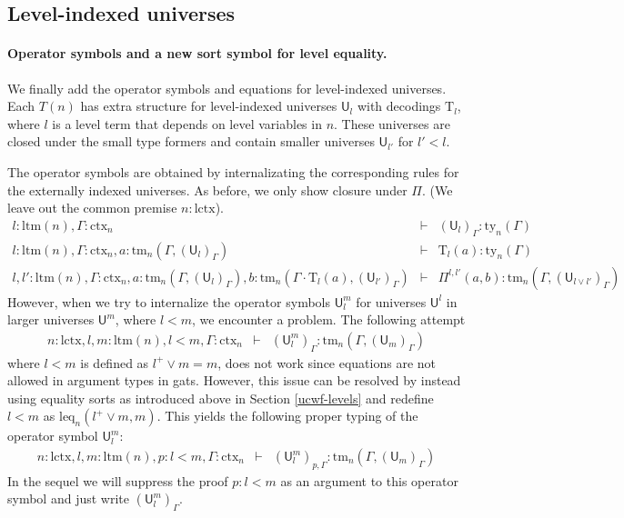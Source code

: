 \documentclass[11pt,a4paper]{article}
\theoremstyle{plain}
\theoremstyle{definition}
\newcommand{\UU}{\mathsf{U}}
\def\UU{\mathsf{U}}
\newcommand{\N}{\mathsf{N}}
\def\Pihat{\Pi}
\def\lctx{\mathrm{lctx}}
\def\ltm{\mathrm{ltm}}
\def\leq{\mathrm{leq}}
\newcommand{\ctx}{\mathrm{ctx}}
\newcommand{\ty}{\mathrm{ty}}
\newcommand{\tm}{\mathrm{tm}}
\def\U{\mathsf{U}}
\newcommand{\Ta}{\mathrm{T}}
\begin{document}
\subsection{Level-indexed universes}

\paragraph{Operator symbols and a new sort symbol for level equality.}
We finally add the operator symbols and equations for level-indexed universes.
Each $T(n)$ has extra structure for level-indexed universes $\UU_l$ with decodings $\Ta_l$, where $l$ is a level term that depends on level variables in $n$. These universes are closed under the small type formers and contain smaller universes $\UU_{l'}$ for $l' < l$.

The operator symbols are obtained by internalizating the corresponding rules for the externally indexed universes. As before, we only show closure under $\Pi$. (We leave out the common premise $n : \lctx$).
\begin{eqnarray*}
l : \ltm(n), \Gamma : \ctx_n &\vdash& (\U_{l})_\Gamma : \ty_n(\Gamma)\\
l : \ltm(n), \Gamma : \ctx_n, a : \tm_n(\Gamma,(\U_{l})_\Gamma) &\vdash& {\Ta_{l}}(a) : \ty_n(\Gamma)\\
 l, l' : \ltm(n), \Gamma : \ctx_n,
a : \tm_n(\Gamma,(\U_{l})_\Gamma),
b :  \tm_n(\Gamma \cdot \Ta_{l}(a), (\U_{l'})_\Gamma)
&\vdash&
 \Pihat^{l,l'}(a,b) : \tm_n(\Gamma,(\U_{l \vee l'})_\Gamma)
\end{eqnarray*}
However, when we try to internalize the operator symbols $\UU^m_l$ for universes $\UU^l$ in larger universes $\UU^m$, where $l < m$, we encounter a problem. The following attempt
\begin{eqnarray*}
n : \lctx, l, m : \ltm(n), l < m, \Gamma : \ctx_n&\vdash&(\UU^m_l)_\Gamma: \tm_n(\Gamma,(\UU_{m})_\Gamma)
\end{eqnarray*}
where $l < m$ is defined as $l^+ \vee m = m$, does not work since equations are not allowed in argument types in gats.
However, this issue can be resolved by instead using equality sorts as introduced above in Section
\ref{ucwf-levels} and redefine $l < m$ as $\leq_n(l^+ \vee m, m)$. This yields the following proper typing of the operator symbol $\UU^m_l$:
\begin{eqnarray*}
n : \lctx, l, m : \ltm(n), p : l < m, \Gamma : \ctx_n&\vdash&(\UU^m_l)_{p,\Gamma} : \tm_n(\Gamma,(\UU_{m})_\Gamma)
\end{eqnarray*}
In the sequel we will suppress the proof $p : l < m$ as an argument to this operator symbol and just write $(\UU^m_l)_{\Gamma}$.
\end{document}
